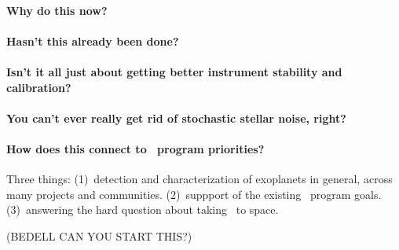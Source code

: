 \documentclass[12pt, letterpaper]{article}
\begin{document}
\paragraph{Why do this now?}

\paragraph{Hasn't this already been done?}

\paragraph{Isn't it all just about getting better instrument stability and calibration?}

\paragraph{You can't ever really get rid of stochastic stellar noise, right?}

\paragraph{How does this connect to \XRP\ program priorities?}

Three things: (1)~detection and characterization of exoplanets in
general, across many projects and communities. (2)~suppport of the
existing \NNEXPLORE\ program goals. (3)~answering the hard question
about taking \EPRV\ to space.

\clearpage
{}

(BEDELL CAN YOU START THIS?)
\end{document}
